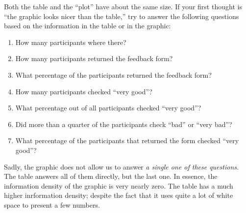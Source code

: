 \bigskip
\par
{}
\bigskip

Both the table and the ``plot'' have about the same size. If your first
thought is ``the graphic looks nicer than the table,'' try to answer
the following questions based on the information in the table or in
the graphic: 
\begin{enumerate}
\item
  How many participants where there?
\item
  How many participants returned the feedback form?
\item
  What percentage of the participants returned the feedback form?
\item
  How many participants checked ``very good''?
\item
  What percentage out of all participants checked ``very good''?
\item
  Did more than a quarter of the participants check ``bad'' or ``very bad''?
\item
  What percentage of the participants that returned the form checked ``very good''?
\end{enumerate}

Sadly, the graphic does not allow us to answer \emph{a single one of these
  questions}. The table answers all of them directly, but the last
one. In essence, the information density of the graphic is very
nearly zero. The table has a much higher inrformation density; despite
the fact that it uses quite a lot of white space to present a few numbers.

